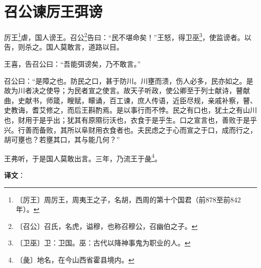 \documentclass[12pt,UTF-8,openany,a4]{ctexbook}
\begin{document}
\chapter{召公谏厉王弭谤}

\begin{large}
    
    厉王\footnote{〔厉王〕\yiwen 周厉王，周夷王之子，名胡，西周的第十个国君（前878至前842年）。}虐，国人谤王。召公\footnote{〔召公〕\yiwen 召氏，名虎，谥穆，也称召穆公，召幽伯之子。}告曰：“民不堪命矣！”王怒，得卫巫\footnote{〔卫巫〕\yiwen 卫：卫国。巫：古代以降神事鬼为职业的人。}，使监谤者。以告，则杀之。国人莫敢言，道路以目。
    
    王喜，告召公曰：“吾能弭谤矣，乃不敢言。”
    
    召公曰：“是障之也。防民之口，甚于防川。川壅而溃，伤人必多，民亦如之。是故为川者决之使导；为民者宣之使言。故天子听政，使公卿至于列士献诗，瞽献曲，史献书，师箴，瞍赋，矇诵，百工谏，庶人传语，近臣尽规，亲戚补察，瞽、史教诲，耆艾修之，而后王斟酌焉。是以事行而不悖。民之有口也，犹土之有山川也，财用于是乎出；犹其有原隰衍沃也，衣食于是乎生。口之宣言也，善败于是乎兴。行善而备败，其所以阜财用衣食者也。夫民虑之于心而宣之于口，成而行之，胡可壅也？若壅其口，其与能几何？”
    
    王弗听，于是国人莫敢出言。三年，乃流王于彘\footnote{〔彘〕\yiwen 地名，在今山西省霍县境内。}。

\end{large}


\newpage

\begin{Large}
   \noindent \textbf{译文}：
\end{Large}

\vspace{1em}
\end{document}
